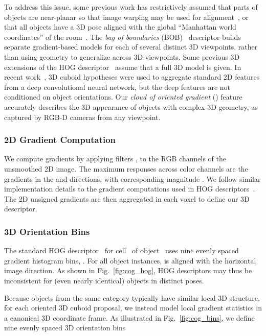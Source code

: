 To address this issue, some previous work has restrictively assumed that parts of objects are near-planar so that image warping may be used for alignment~\cite{fidler20123d}, or that all objects have a 3D pose aligned with the global ``Manhattan world coordinates'' of the room~\cite{hedau2010thinking}. 
The \emph{bag of boundaries} (BOB)~\cite{payet2011contours} descriptor builds separate gradient-based models for each of several distinct 3D viewpoints, rather than using geometry to generalize across 3D viewpoints.
Some previous 3D extensions of the HOG descriptor~\cite{buch20093d, scherer2010histograms} assume that a full 3D model is given. 
In recent work~\cite{song2016}, 3D cuboid hypotheses were used to aggregate standard 2D features from a deep convolutional neural network, but the deep features are not conditioned on object orientations.
Our \emph{cloud of oriented gradient} (\cog) feature accurately describes the 3D appearance of objects with complex 3D geometry, as captured by RGB-D cameras from any viewpoint.


\subsubsection{2D Gradient Computation} We compute gradients by applying filters ,  to the RGB channels of the unsmoothed 2D image. The maximum responses across color channels are the gradients  in the  and  directions, with corresponding magnitude .
We follow similar implementation details to the gradient computations used in HOG descriptors~\cite{dalal2005histograms}. 
The 2D unsigned gradients are then aggregated in each voxel to define our 3D \cog descriptor.


\subsubsection{3D Orientation Bins} 
The standard HOG descriptor~\cite{dalal2005histograms} for cell~ of object~ uses nine evenly spaced gradient histogram bins, 
.
For all object instances,
 is aligned with the horizontal image direction.
As shown in Fig.~\ref{fig:cog_hog}, HOG descriptors may thus be inconsistent for (even nearly identical) objects in distinct poses. 

Because objects from the same category typically have similar local 3D structure, for each oriented 3D cuboid proposal, we instead model local gradient statistics in a canonical 3D coordinate frame.
As illustrated in Fig.~\ref{fig:cog_bins}, we define nine evenly spaced 3D orientation bins 

